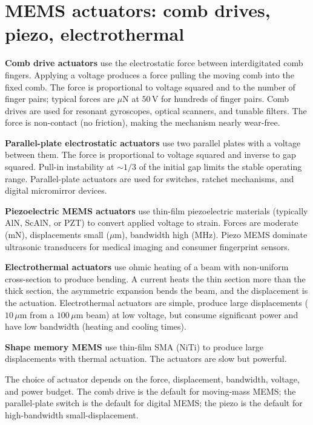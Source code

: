 \section{MEMS actuators: comb drives, piezo, electrothermal}

\textbf{Comb drive actuators} use the electrostatic force between interdigitated comb fingers. Applying a voltage produces a force pulling the moving comb into the fixed comb. The force is proportional to voltage squared and to the number of finger pairs; typical forces are $\mu\text{N}$ at $50\,\text{V}$ for hundreds of finger pairs. Comb drives are used for resonant gyroscopes, optical scanners, and tunable filters. The force is non-contact (no friction), making the mechanism nearly wear-free.

\textbf{Parallel-plate electrostatic actuators} use two parallel plates with a voltage between them. The force is proportional to voltage squared and inverse to gap squared. Pull-in instability at $\sim 1/3$ of the initial gap limits the stable operating range. Parallel-plate actuators are used for switches, ratchet mechanisms, and digital micromirror devices.

\textbf{Piezoelectric MEMS actuators} use thin-film piezoelectric materials (typically AlN, ScAlN, or PZT) to convert applied voltage to strain. Forces are moderate (mN), displacements small ($\mu\text{m}$), bandwidth high (MHz). Piezo MEMS dominate ultrasonic transducers for medical imaging and consumer fingerprint sensors.

\textbf{Electrothermal actuators} use ohmic heating of a beam with non-uniform cross-section to produce bending. A current heats the thin section more than the thick section, the asymmetric expansion bends the beam, and the displacement is the actuation. Electrothermal actuators are simple, produce large displacements ($10\,\mu\text{m}$ from a $100\,\mu\text{m}$ beam) at low voltage, but consume significant power and have low bandwidth (heating and cooling times).

\textbf{Shape memory MEMS} use thin-film SMA (NiTi) to produce large displacements with thermal actuation. The actuators are slow but powerful.

The choice of actuator depends on the force, displacement, bandwidth, voltage, and power budget. The comb drive is the default for moving-mass MEMS; the parallel-plate switch is the default for digital MEMS; the piezo is the default for high-bandwidth small-displacement.

